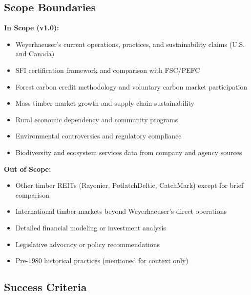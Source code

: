 \documentclass[11pt,letterpaper]{article}
\begin{document}
\subsection{Scope Boundaries}

\textbf{\sffamily In Scope (v1.0):}
\begin{itemize}[leftmargin=2em]
\item Weyerhaeuser's current operations, practices, and sustainability claims (U.S. and Canada)
\item SFI certification framework and comparison with FSC/PEFC
\item Forest carbon credit methodology and voluntary carbon market participation
\item Mass timber market growth and supply chain sustainability
\item Rural economic dependency and community programs
\item Environmental controversies and regulatory compliance
\item Biodiversity and ecosystem services data from company and agency sources
\end{itemize}

\textbf{\sffamily Out of Scope:}
\begin{itemize}[leftmargin=2em]
\item Other timber REITs (Rayonier, PotlatchDeltic, CatchMark) except for brief comparison
\item International timber markets beyond Weyerhaeuser's direct operations
\item Detailed financial modeling or investment analysis
\item Legislative advocacy or policy recommendations
\item Pre-1980 historical practices (mentioned for context only)
\end{itemize}

\subsection{Success Criteria}
\end{document}
